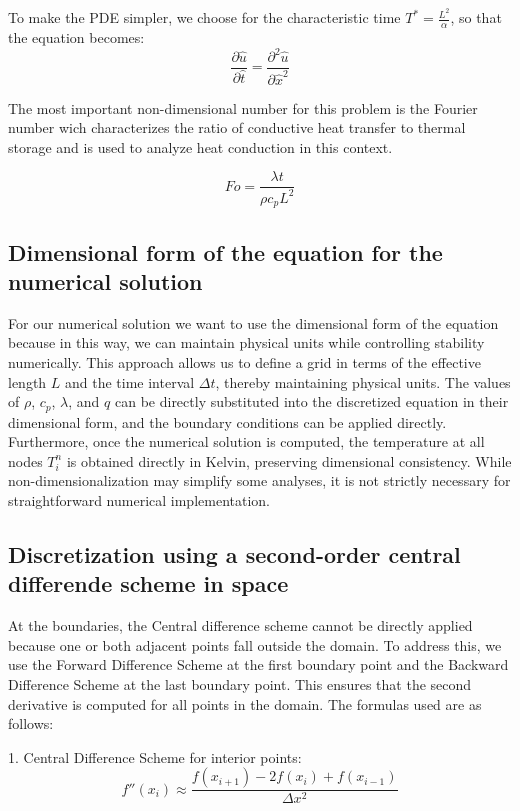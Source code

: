 \documentclass{article}
\begin{document}
To make the PDE simpler, we choose for the characteristic time \( T^* = \frac{L^2}{\alpha}\), so that the equation becomes:
\[
\frac{\partial \hat{u}}{\partial \hat{t}} = \frac{\partial^2 \hat{u}}{\partial \hat{x}^2}
\]

The most important non-dimensional number for this problem is the Fourier number wich characterizes 
the ratio of conductive heat transfer to thermal storage and is used to analyze heat conduction in this context.

\[
Fo = \frac{\lambda t}{\rho c_p L^2}
\]

\subsection{Dimensional form of the equation for the numerical solution}

For our numerical solution we want to use the dimensional form of the equation because in this way, we can maintain physical units while 
controlling stability numerically. This approach allows us to define a grid in terms of the effective length $L$ and the time interval 
$\Delta t$, thereby maintaining physical units. The values of $\rho$, $c_p$, $\lambda$, and $q$ can be directly substituted into 
the discretized equation in their dimensional form, and the boundary conditions can be applied directly. Furthermore, once the numerical 
solution is computed, the temperature at all nodes $T_i^n$ is obtained directly in Kelvin, preserving dimensional consistency. 
While non-dimensionalization may simplify some analyses, it is not strictly necessary for straightforward numerical implementation.

\subsection{Discretization using a second-order central differende scheme in space}

At the boundaries, the Central difference scheme cannot be directly applied because one or both adjacent points fall outside the domain. 
To address this, we use the Forward Difference Scheme at the first boundary point and the Backward Difference Scheme at the last boundary point. 
This ensures that the second derivative is computed for all points in the domain. The formulas used are as follows:

1. Central Difference Scheme for interior points:
\[
f''(x_i) \approx \frac{f(x_{i+1}) - 2f(x_i) + f(x_{i-1})}{\Delta x^2}
\]
\end{document}
